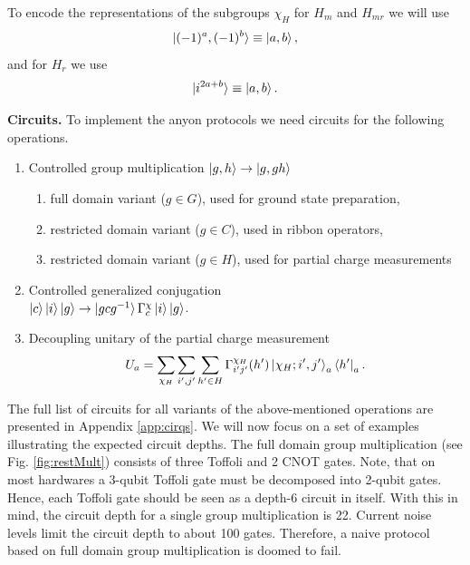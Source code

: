 \documentclass[two column]{article}
\newcommand{\caro}[1]{\textcolor{red}{[#1]}}
\begin{document}
To encode the representations of the subgroups $\chi_H$ for $H_m$ and $H_{mr}$ we will use
\begin{equation}
    \ket{(-1)^a,(-1)^b} \equiv \ket{a,b},
\end{equation}
and for $H_{r}$ we use
\begin{equation}
    \ket{i^{2a+b}} \equiv \ket{a, b}.
\end{equation}


\textbf{Circuits.} To implement the anyon protocols we need circuits for the following operations.
\begin{enumerate}
    \item Controlled group multiplication $\ket{g, h} \rightarrow \ket{g, gh}$  \begin{enumerate}
        \item full domain variant ($g \in G$), used for ground state preparation,
        \item restricted domain variant ($g \in C$), used in ribbon operators,
        \item restricted domain variant ($g \in H$), used for partial charge measurements 
    \end{enumerate}
    \item Controlled generalized conjugation\\ $\ket{c} \ket{i}\ket{g} \rightarrow \ket{gcg^{-1}} \Gamma^\chi_{c} \ket{i}\ket{g}$.
    \item Decoupling unitary of the partial charge measurement $$ U_a = \sum_{\chi_H}\sum_{i', j'}\sum_{h'\in H}  \Gamma^{\chi_H}_{i'j'}(h')  \ket{\chi_H; i', j'}_a\bra{h'}_a. $$
\end{enumerate} 

The full list of circuits for all variants of the above-mentioned operations are presented in Appendix \ref{app:cirqs}.
We will now focus on a set of examples illustrating the expected circuit depths. The full domain group multiplication (see Fig. \ref{fig:restMult}) consists of three Toffoli and 2 CNOT gates. Note, that on most hardwares a 3-qubit Toffoli gate must be decomposed into 2-qubit gates. Hence, each Toffoli gate should be seen as a depth-6 circuit in itself. With this in mind, the circuit depth for a single group multiplication is 22. Current noise levels limit the circuit depth to about 100 gates. Therefore, a naive protocol based on full domain group multiplication is doomed to fail. 
\end{document}
